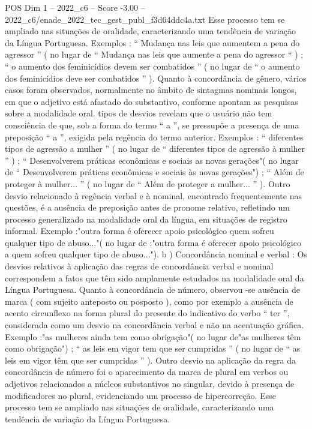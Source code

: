 \begin{textsample}{POS Dim 1 – 2022\_c6 – Score -3.00 – 2022\_c6/enade\_2022\_tec\_gest\_publ\_f3d64ddc4a.txt}
Esse processo tem se ampliado nas situações de oralidade, caracterizando uma tendência de variação da Língua Portuguesa.
Exemplos : “ Mudança nas leis que aumentem a pena do agressor ” ( no lugar de “ Mudança nas leis que aumente a pena do agressor “ ) ; “ o aumento dos feminicídios devem ser combatidos ” ( no lugar de “ o aumento dos feminicídios deve ser combatidos ” ).
Quanto à concordância de gênero, vários casos foram observados, normalmente no âmbito de sintagmas nominais longos, em que o adjetivo está afastado do substantivo, conforme apontam as pesquisas sobre a modalidade oral. tipos de desvios revelam que o usuário não tem consciência de que, sob a forma do termo “ a ”, se pressupõe a presença de uma preposição “ a ”, exigida pela regência do termo anterior.
Exemplos : “ diferentes tipos de agressão a mulher ” ( no lugar de “ diferentes tipos de agressão à mulher ” ) ; “ Desenvolverem práticas econômicas e sociais as novas gerações"( no lugar de “ Desenvolverem práticas econômicas e sociais às novas gerações") ; “ Além de proteger à mulher... ” ( no lugar de “ Além de proteger a mulher... ” ).
Outro desvio relacionado à regência verbal e à nominal, encontrado frequentemente nas questões, é a ausência de preposição antes de pronome relativo, refletindo um processo generalizado na modalidade oral da língua, em situações de registro informal.
Exemplo :"outra forma é oferecer apoio psicológico quem sofreu qualquer tipo de abuso..."( no lugar de :"outra forma é oferecer apoio psicológico a quem sofreu qualquer tipo de abuso..."). b ) Concordância nominal e verbal : Os desvios relativos à aplicação das regras de concordância verbal e nominal correspondem a fatos que têm sido amplamente estudados na modalidade oral da Língua Portuguesa.
Quanto à concordância de número, observou -se ausência de marca ( com sujeito anteposto ou posposto ), como por exemplo a ausência de acento circunflexo na forma plural do presente do indicativo do verbo “ ter ”, considerada como um desvio na concordância verbal e não na acentuação gráfica.
Exemplo :"as mulheres ainda tem como obrigação"( no lugar de"as mulheres têm como obrigação") ; “ as leis em vigor tem que ser cumpridas ” ( no lugar de “ as leis em vigor têm que ser cumpridas ” ).
Outro desvio na aplicação da regra da concordância de número foi o aparecimento da marca de plural em verbos ou adjetivos relacionados a núcleos substantivos no singular, devido à presença de modificadores no plural, evidenciando um processo de hipercorreção.
Esse processo tem se ampliado nas situações de oralidade, caracterizando uma tendência de variação da Língua Portuguesa.

\end{textsample}
